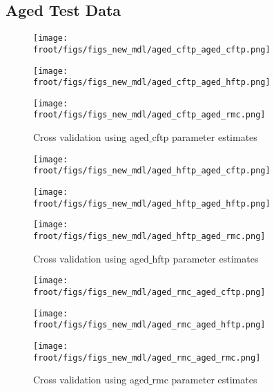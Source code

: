 \subsection{Aged Test Data}

\begin{figure}[H]
        \begin{minipage}{0.33\textwidth}
                \texttt{[image: \\froot/figs/figs\_new\_mdl/aged\_cftp\_aged\_cftp.png]}
        \end{minipage}
        \begin{minipage}{0.33\textwidth}
                \texttt{[image: \\froot/figs/figs\_new\_mdl/aged\_cftp\_aged\_hftp.png]}
        \end{minipage}
        \begin{minipage}{0.33\textwidth}
                \texttt{[image: \\froot/figs/figs\_new\_mdl/aged\_cftp\_aged\_rmc.png]}
        \end{minipage}
        \caption{Cross validation using aged$\_$cftp parameter estimates}
\end{figure}

\begin{figure}[H]
        \begin{minipage}{0.33\textwidth}
                \texttt{[image: \\froot/figs/figs\_new\_mdl/aged\_hftp\_aged\_cftp.png]}
        \end{minipage}
        \begin{minipage}{0.33\textwidth}
                \texttt{[image: \\froot/figs/figs\_new\_mdl/aged\_hftp\_aged\_hftp.png]}
        \end{minipage}
        \begin{minipage}{0.33\textwidth}
                \texttt{[image: \\froot/figs/figs\_new\_mdl/aged\_hftp\_aged\_rmc.png]}
        \end{minipage}
        \caption{Cross validation using aged$\_$hftp parameter estimates}
\end{figure}

\begin{figure}[H]
        \begin{minipage}{0.33\textwidth}
                \texttt{[image: \\froot/figs/figs\_new\_mdl/aged\_rmc\_aged\_cftp.png]}
        \end{minipage}
        \begin{minipage}{0.33\textwidth}
                \texttt{[image: \\froot/figs/figs\_new\_mdl/aged\_rmc\_aged\_hftp.png]}
        \end{minipage}
        \begin{minipage}{0.33\textwidth}
                \texttt{[image: \\froot/figs/figs\_new\_mdl/aged\_rmc\_aged\_rmc.png]}
        \end{minipage}
        \caption{Cross validation using aged$\_$rmc parameter estimates}
\end{figure}


